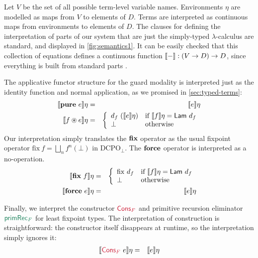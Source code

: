 Let $V$ be the set of all possible term-level variable
names. Environments $\eta$ are modelled as maps from $V$ to elements
of $D$. Terms are interpreted as continuous maps from environments to
elements of $D$. The clauses for defining the interpretation of parts
of our system that are just the simply-typed $\lambda$-calculus are
standard, and displayed in \autoref{fig:semantics1}. It can be easily
checked that this collection of equations defines a continuous
function $\llbracket - \rrbracket : (V \to D) \to D$, since everything is built from
standard parts \cite{mitchell}.

The applicative functor structure for the guard modality is
interpreted just as the identity function and normal application, as
we promised in \autoref{sec:typed-terms}:
\begin{eqnarray*}
  \sem{\kw{pure}\ e}\eta & = & \sem{e}\eta \\
  \sem{f \circledast e}\eta & = & \left\{
    \begin{array}{ll}
      d_f\ (\sem{e}\eta) & \textrm{if}\ \sem{f}\eta = \semCons{Lam}\ d_f \\
      \bot & \textrm{otherwise}
    \end{array}
  \right.
\end{eqnarray*}
Our interpretation simply translates the $\textbf{fix}$ operator as the
usual fixpoint operator $\mathrm{fix}\ f = \bigsqcup_n f^n(\bot)$ in
$\mathrm{DCPO}_\bot$. The $\textbf{force}$ operator is interpreted as a
no-operation.
\begin{eqnarray*}
  \sem{\kw{fix}\ f}\eta & = &
  \left\{
    \begin{array}{ll}
      \mathrm{fix}\ d_f & \textrm{if }\sem{f}\eta = \semCons{Lam}\ d_f \\
      \bot & \textrm{otherwise}
    \end{array}
  \right.\\
  \sem{\kw{force}\ e}\eta & = & \sem{e}\eta
\end{eqnarray*}

Finally, we interpret the constructor $\cons{Cons$_F$}$ and primitive
recursion eliminator $\elim{primRec$_F$}$ for least fixpoint
types. The interpretation of construction is straightforward: the
constructor itself disappears at runtime, so the interpretation simply
ignores it:
\begin{eqnarray*}
  \sem{\cons{Cons$_F$}\ e}\eta & = & \sem{e}\eta
\end{eqnarray*}


